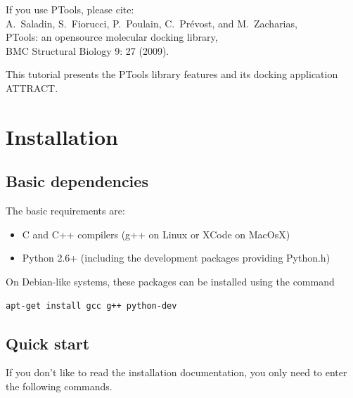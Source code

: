 \documentclass[12pt,a4paper]{article}
\begin{document}
\vspace*{1cm}
If you use PTools, please cite: \\
A.~Saladin, S.~Fiorucci, P.~Poulain, C.~Pr\'evost, and M.~Zacharias,\\
PTools: an opensource molecular docking library,\\
BMC Structural Biology 9: 27 (2009).

\vspace*{1cm}

\noindent
This tutorial presents the PTools library features and its docking application ATTRACT.

\newpage

\tableofcontents{}

\newpage

\section{Installation}

\subsection{Basic dependencies}
The basic requirements are:
\begin{itemize}
\item C and C++ compilers (g++ on Linux or XCode on MacOsX) 
\item Python 2.6+ (including the development packages providing Python.h)
\end{itemize}

On Debian-like systems, these packages can be installed using the command
\begin{verbatim}
apt-get install gcc g++ python-dev
\end{verbatim}

\subsection{Quick start}

If you don't like to read the installation documentation, you only need to enter the following commands.
\end{document}
